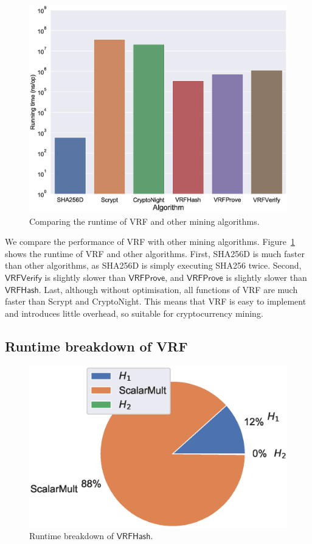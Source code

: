 \begin{figure}[htp]
    \centering
    \includegraphics[width=\linewidth]{figs/runtime-comparison.eps}
    \caption{Comparing the runtime of VRF and other mining algorithms.}
    \label{fig:runtime-comparison}
\end{figure}

We compare the performance of VRF with other mining algorithms.
Figure~\ref{fig:runtime-comparison} shows the runtime of VRF and other algorithms.
First, SHA256D is much faster than other algorithms, as SHA256D is simply executing SHA256 twice.
Second, $\mathsf{VRFVerify}$ is slightly slower than $\mathsf{VRFProve}$, and $\mathsf{VRFProve}$ is slightly slower than $\mathsf{VRFHash}$.
Last, although without optimisation, all functions of VRF are much faster than Scrypt and CryptoNight.
This means that VRF is easy to implement and introduces little overhead, so suitable for cryptocurrency mining.



\subsection{Runtime breakdown of VRF}

\begin{figure}[htp]
    \centering
    \includegraphics[width=.7\linewidth]{figs/runtime-breakdown.eps}
    \caption{Runtime breakdown of $\mathsf{VRFHash}$.}
    \label{fig:runtime-breakdown}
\end{figure}

